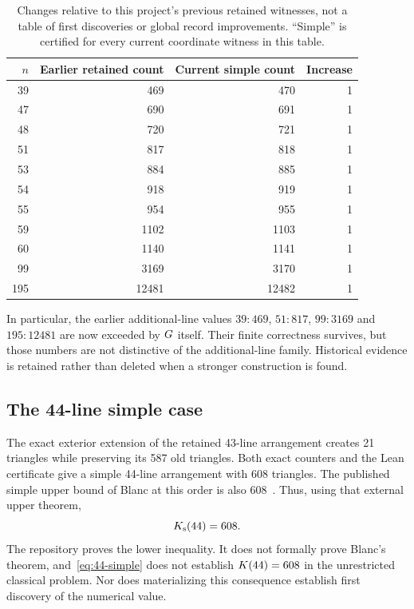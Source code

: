\begin{table}[tbp]
\centering
\begin{tabular}{@{}rrrr@{}}
\toprule
$n$ & Earlier retained count & Current simple count & Increase\\
\midrule
39&469&470&1\\
47&690&691&1\\
48&720&721&1\\
51&817&818&1\\
53&884&885&1\\
54&918&919&1\\
55&954&955&1\\
59&1102&1103&1\\
60&1140&1141&1\\
99&3169&3170&1\\
195&12481&12482&1\\
\bottomrule
\end{tabular}
\caption{Changes relative to this project's previous retained witnesses, not a table of first discoveries or global record improvements. ``Simple'' is certified for every current coordinate witness in this table.}\label{tab:finite-refinement}
\end{table}

In particular, the earlier additional-line values $39:469$, $51:817$, $99:3169$ and $195:12481$ are now exceeded by $G$ itself. Their finite correctness survives, but those numbers are not distinctive of the additional-line family. Historical evidence is retained rather than deleted when a stronger construction is found.

\subsection{The 44-line simple case}

The exact exterior extension of the retained 43-line arrangement creates 21 triangles while preserving its 587 old triangles. Both exact counters and the Lean certificate give a simple 44-line arrangement with 608 triangles. The published simple upper bound of Blanc at this order is also 608~\cite{blanc2011}. Thus, using that external upper theorem,
\begin{equation}\label{eq:44-simple}
K_{\mathrm{s}}(44)=608.
\end{equation}
The repository proves the lower inequality. It does not formally prove Blanc's theorem, and~\eqref{eq:44-simple} does not establish $K(44)=608$ in the unrestricted classical problem. Nor does materializing this consequence establish first discovery of the numerical value.

